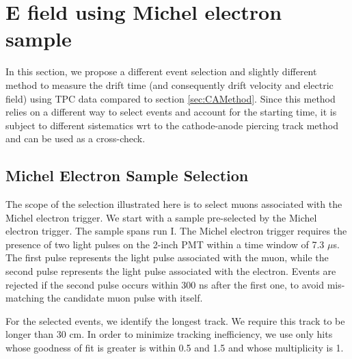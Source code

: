 \section{E field using Michel electron sample}\label{sec:michelEl}
In this section, we propose a different event selection and slightly different method to measure the drift time (and consequently drift velocity and electric field) using TPC data compared to section \ref{sec:CAMethod}.
Since this method relies on a different way to select events and account for the starting time, it is subject to different sistematics wrt to the cathode-anode piercing track method and can be used as a cross-check.

\subsection{Michel Electron Sample Selection}\label{sec:SampleSelectionME}
The scope of the selection illustrated here is to select muons associated with the Michel electron trigger. 
We start with a sample pre-selected by the Michel electron trigger. The sample spans run I. The Michel electron trigger requires the presence of two light pulses on the 2-inch PMT within a time window of 7.3 $\mu$s. The first pulse represents the light pulse associated with the muon, while the second pulse  represents the light pulse associated with the electron. Events are rejected if the second pulse occurs within 300 ns  after the first one, to avoid mis-matching the candidate muon pulse with itself.

For the selected events, we identify the longest track. We require this track to be longer than 30 cm. In order to minimize tracking inefficiency, we use only hits whose goodness of fit is greater is within 0.5 and 1.5 and whose multiplicity is 1.



